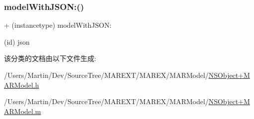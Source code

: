 \subsubsection{\texorpdfstring{model\+With\+J\+S\+O\+N\+:()}{modelWithJSON:()}}
{\footnotesize\ttfamily + (instancetype) model\+With\+J\+S\+O\+N\+: \begin{DoxyParamCaption}\item[{(id)}]{json }\end{DoxyParamCaption}\hspace{0.3cm}{\ttfamily [implementation]}}



该分类的文档由以下文件生成\+:\begin{DoxyCompactItemize}
\item 
/\+Users/\+Martin/\+Dev/\+Source\+Tree/\+M\+A\+R\+E\+X\+T/\+M\+A\+R\+E\+X/\+M\+A\+R\+Model/\hyperlink{_n_s_object_09_m_a_r_model_8h}{N\+S\+Object+\+M\+A\+R\+Model.\+h}\item 
/\+Users/\+Martin/\+Dev/\+Source\+Tree/\+M\+A\+R\+E\+X\+T/\+M\+A\+R\+E\+X/\+M\+A\+R\+Model/\hyperlink{_n_s_object_09_m_a_r_model_8m}{N\+S\+Object+\+M\+A\+R\+Model.\+m}\end{DoxyCompactItemize}
